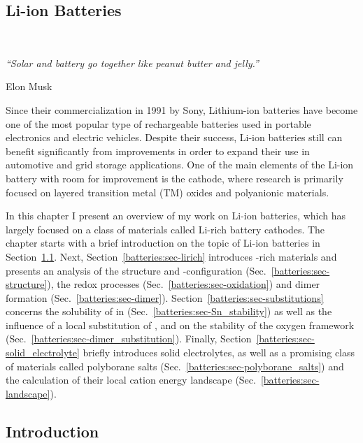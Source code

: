 \begin{refsection} 
 
\chapter{Li-ion Batteries}~\label{chapter:batteries} 
 
\setlength{\epigraphwidth}{3in} 
\epigraph{\textit{``Solar and battery go together like peanut butter and 
jelly.” }}{Elon Musk} 
\vspace{3em} 
 
Since their commercialization in 1991 by Sony, Lithium-ion batteries have 
become one of the most popular type of rechargeable batteries used in portable 
electronics and electric vehicles. Despite their success, Li-ion batteries 
still can benefit significantly from improvements in order to expand their use in 
automotive and grid storage applications. One of the main elements of the 
Li-ion battery with room for improvement is the cathode, where research is primarily 
focused on layered transition metal (TM) oxides and polyanionic materials.  
 
In this chapter I present an overview of my work on Li-ion batteries, which 
has largely focused on a class of materials called Li-rich battery cathodes. 
The chapter starts with a brief introduction on the topic of Li-ion 
batteries in Section~\ref{batteries:sec-intro}. Next, 
Section~\ref{batteries:sec-lirich} introduces -rich materials and 
presents an analysis of the structure and -configuration 
(Sec.~\ref{batteries:sec-structure}), the redox processes 
(Sec.~\ref{batteries:sec-oxidation}) and dimer formation 
(Sec.~\ref{batteries:sec-dimer}). Section~\ref{batteries:sec-substitutions} concerns the solubility of  
in  (Sec.~\ref{batteries:sec-Sn_stability}) as well as the 
influence of a local substitution of ,  and  on the 
stability of the oxygen framework 
(Sec.~\ref{batteries:sec-dimer_substitution}). Finally, 
Section~\ref{batteries:sec-solid_electrolyte} briefly introduces solid 
electrolytes, as well as a promising class of materials called 
polyborane salts (Sec.~\ref{batteries:sec-polyborane_salts}) and the 
calculation of their local cation energy landscape 
(Sec.~\ref{batteries:sec-landscape}).
 
\clearpage 
 
\section{Introduction} \label{batteries:sec-intro} 
 

\end{refsection}
